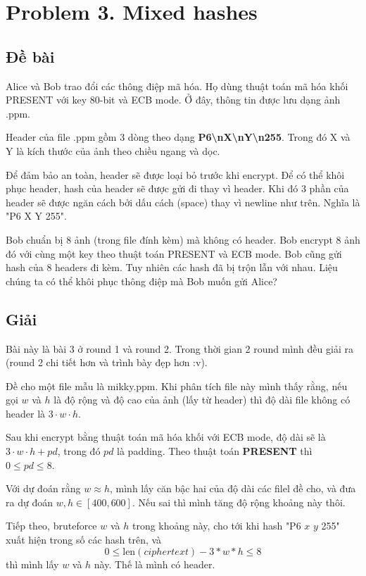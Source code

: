 \section*{Problem 3. Mixed hashes}

\subsection*{Đề bài}

Alice và Bob trao đổi các thông điệp mã hóa. Họ dùng thuật toán mã hóa khối PRESENT với key 80-bit và ECB mode. Ở đây, thông tin được lưu dạng ảnh .ppm.

Header của file .ppm gồm 3 dòng theo dạng \textbf{P6\textbackslash nX\textbackslash nY\textbackslash n255}. Trong đó X và Y là kích thước của ảnh theo chiều ngang và dọc.

Để đảm bảo an toàn, header sẽ được loại bỏ trước khi encrypt. Để có thể khôi phục header, hash của header sẽ được gửi đi thay vì header. Khi đó 3 phần của header sẽ được ngăn cách bởi dấu cách (space) thay vì newline như trên. Nghĩa là "P6 X Y 255".

Bob chuẩn bị 8 ảnh (trong file đính kèm) mà không có header. Bob encrypt 8 ảnh đó với cùng một key theo thuật toán PRESENT và ECB mode. Bob cũng gửi hash của 8 headers đi kèm. Tuy nhiên các hash đã bị trộn lẫn với nhau. Liệu chúng ta có thể khôi phục thông điệp mà Bob muốn gửi Alice?

\subsection*{Giải}

Bài này là bài 3 ở round 1 và round 2. Trong thời gian 2 round mình đều giải ra (round 2 chi tiết hơn và trình bày đẹp hơn :v).

Đề cho một file mẫu là mikky.ppm. Khi phân tích file này mình thấy rằng, nếu gọi $w$ và $h$ là độ rộng và độ cao của ảnh (lấy từ header) thì độ dài file không có header là $3 \cdot w \cdot h$.

Sau khi encrypt bằng thuật toán mã hóa khối với ECB mode, độ dài sẽ là $3 \cdot w \cdot h + pd$, trong đó $pd$ là padding. Theo thuật toán \textbf{PRESENT} thì $0 \leqslant pd \leqslant 8$.

Với dự đoán rằng $w \approx h$, mình lấy căn bậc hai của độ dài các filel đề cho, và đưa ra dự đoán $w, h \in [400, 600]$. Nếu sai thì mình tăng độ rộng khoảng này thôi.

Tiếp theo, bruteforce $w$ và $h$ trong khoảng này, cho tới khi hash "P6 $x$ $y$ 255" xuất hiện trong số các hash trên, và \[ 0 \leqslant \text{len} (ciphertext) - 3 * w * h \leqslant 8 \] thì mình lấy $w$ và $h$ này. Thế là mình có header.

